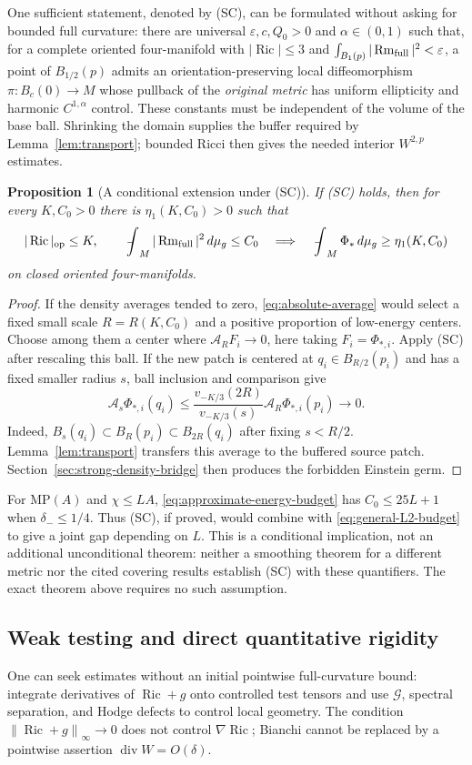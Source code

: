 \documentclass[a4paper,11pt]{article}
\numberwithin{equation}{section}
\newtheorem{proposition}[theorem]{Proposition}
\theoremstyle{definition}
\newcommand{\Ric}{\operatorname{Ric}}
\newcommand{\Rm}{\operatorname{Rm}}
\newcommand{\op}{\mathrm{op}}
\newcommand{\dd}{\,d\mu_g}
\newcommand{\fint}{\mathop{\rlap{\,\raisebox{0.1ex}{\tiny$-$}}\int}\nolimits}
\newcommand{\norm}[1]{\left\lVert#1\right\rVert}
\begin{document}
One sufficient statement, denoted by (SC), can be formulated without asking for bounded full curvature: there are universal $\varepsilon,c,Q_0>0$ and $\alpha\in(0,1)$ such that, for a complete oriented four-manifold with $|\Ric|\le3$ and $\int_{B_1(p)}|\Rm_{\rm full}|^2<\varepsilon$, a point of $B_{1/2}(p)$ admits an orientation-preserving local diffeomorphism $\pi:B_c(0)\to M$ whose pullback of the \emph{original metric} has uniform ellipticity and harmonic $C^{1,\alpha}$ control. These constants must be independent of the volume of the base ball. Shrinking the domain supplies the buffer required by Lemma~\ref{lem:transport}; bounded Ricci then gives the needed interior $W^{2,p}$ estimates.

\begin{proposition}[A conditional extension under (SC)]\label{prop:SC-density}
If (SC) holds, then for every $K,C_0>0$ there is $\eta_1(K,C_0)>0$ such that
\[
|\Ric|_{\op}\le K,\qquad \fint_M|\Rm_{\rm full}|^2\dd\le C_0
\quad\Longrightarrow\quad \fint_M\Phi_*\dd\ge\eta_1(K,C_0)
\]
on closed oriented four-manifolds.
\end{proposition}
\begin{proof}
If the density averages tended to zero, \eqref{eq:absolute-average} would select a fixed small scale $R=R(K,C_0)$ and a positive proportion of low-energy centers. Choose among them a center where $\mathcal A_RF_i\to0$, here taking $F_i=\Phi_{*,i}$. Apply (SC) after rescaling this ball. If the new patch is centered at $q_i\in B_{R/2}(p_i)$ and has a fixed smaller radius $s$, ball inclusion and comparison give
\[
\mathcal A_s\Phi_{*,i}(q_i)
\le\frac{v_{-K/3}(2R)}{v_{-K/3}(s)}\mathcal A_R\Phi_{*,i}(p_i)
\longrightarrow0.
\]
Indeed, $B_s(q_i)\subset B_R(p_i)\subset B_{2R}(q_i)$ after fixing $s<R/2$. Lemma~\ref{lem:transport} transfers this average to the buffered source patch. Section~\ref{sec:strong-density-bridge} then produces the forbidden Einstein germ.
\end{proof}
For $\mathrm{MP}(A)$ and $\chi\le LA$, \eqref{eq:approximate-energy-budget} has $C_0\le25L+1$ when $\delta_-\le1/4$. Thus (SC), if proved, would combine with \eqref{eq:general-L2-budget} to give a joint gap depending on $L$. This is a conditional implication, not an additional unconditional theorem: neither a smoothing theorem for a different metric nor the cited covering results establish (SC) with these quantifiers. The exact theorem above requires no such assumption.

\subsection{Weak testing and direct quantitative rigidity}
One can seek estimates without an initial pointwise full-curvature bound: integrate derivatives of $\Ric+g$ onto controlled test tensors and use $\mathcal G$, spectral separation, and Hodge defects to control local geometry. The condition $\norm{\Ric+g}_\infty\to0$ does not control $\nabla\Ric$; Bianchi cannot be replaced by a pointwise assertion $\operatorname{div}W=O(\delta)$.
\end{document}
